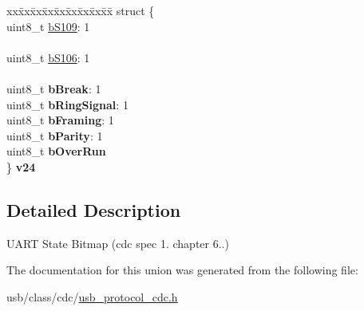 \begin{DoxyCompactItemize}
\begin{tabbing}
\end{tabbing}\item 
\mbox{\label{unionusb__cdc__uart__state_a525c79907e6918489f0f2db168665b4f}} 
\begin{tabbing}
xx\=xx\=xx\=xx\=xx\=xx\=xx\=xx\=xx\=\kill
struct \{\\
\>uint8\_t \hyperlink{unionusb__cdc__uart__state_a6c05d44bfdaddc64bfc5d954d1f4b092}{bS109}: 1\\
\>\\
\>uint8\_t \hyperlink{unionusb__cdc__uart__state_a1e2b7d538828fa29791af00b6cecfd2c}{bS106}: 1\\
\>\\
\>uint8\_t {\bfseries bBreak}: 1\\
\>uint8\_t {\bfseries bRingSignal}: 1\\
\>uint8\_t {\bfseries bFraming}: 1\\
\>uint8\_t {\bfseries bParity}: 1\\
\>uint8\_t {\bfseries bOverRun}\\
\} {\bfseries v24}\\

\end{tabbing}\end{DoxyCompactItemize}


\subsection{Detailed Description}
U\+A\+RT State Bitmap (cdc spec 1. chapter 6..) 

The documentation for this union was generated from the following file\+:\begin{DoxyCompactItemize}
\item 
usb/class/cdc/\hyperlink{usb__protocol__cdc_8h}{usb\+\_\+protocol\+\_\+cdc.\+h}\end{DoxyCompactItemize}
